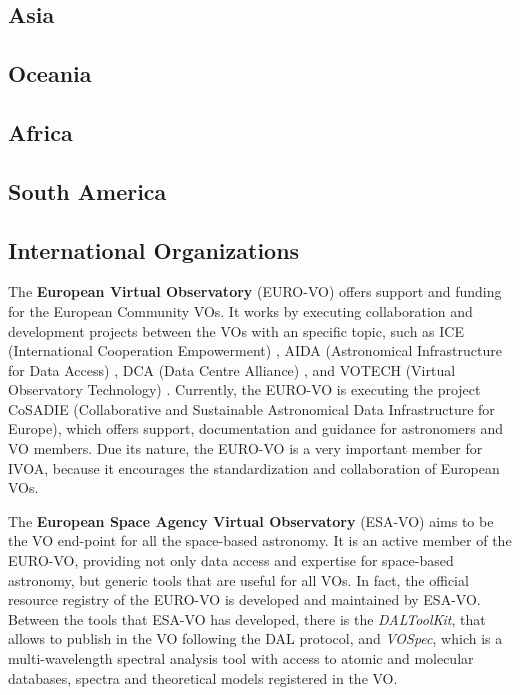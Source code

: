\subsection{Asia}


\subsection{Oceania}


\subsection{Africa}


\subsection{South America}

\subsection{International Organizations}

The \textbf{European Virtual Observatory} (EURO-VO) offers support and funding
for the European Community VOs.  It works by executing collaboration and
development projects between the VOs with an specific topic, such as ICE
(International Cooperation Empowerment) \cite{},
AIDA (Astronomical Infrastructure for Data Access) \cite{},
DCA (Data Centre Alliance) \cite{}, and
VOTECH (Virtual Observatory Technology) \cite{}.
Currently, the EURO-VO is executing the project CoSADIE (Collaborative and
Sustainable Astronomical Data Infrastructure for Europe), which offers 
support, documentation and guidance for astronomers and VO members.
Due its nature, the EURO-VO is a very important member for IVOA, because
it encourages the standardization and collaboration of European VOs.

The \textbf{European Space Agency Virtual Observatory} (ESA-VO) aims to be the
VO end-point for all the space-based astronomy.  It is an active member of the
EURO-VO, providing not only data access and expertise for space-based astronomy,
but generic tools that are useful for all VOs. In fact, the official resource
registry of the EURO-VO is developed and maintained by ESA-VO. 
Between the tools that ESA-VO has developed, there is the \emph{DALToolKit},
that allows to publish in the VO following the DAL protocol, and \emph{VOSpec},
which is a multi-wavelength spectral analysis tool with access to atomic and
molecular databases, spectra and theoretical models registered in the VO.

